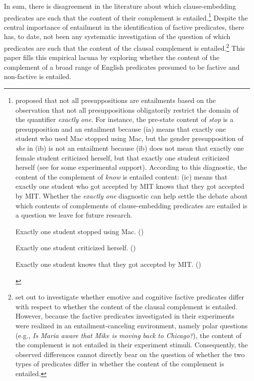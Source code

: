 \documentclass[11pt,fleqn]{article}
\newcommand{\6}{\mbox{$[\hspace*{-.6mm}[$}}
\newcommand{\9}{\mbox{$]\hspace*{-.6mm}]$}}
\begin{document}
In sum, there is disagreement in the literature about which clause-embedding predicates are such that the content of their complement is entailed.\footnote{\citealt{sudo-thesis} proposed that not all presuppositions are entailments based on the observation that not all presuppositions obligatorily restrict the domain of the quantifier {\em exactly one}. For instance, the pre-state content of {\em stop} is a presupposition and an entailment because (ia) means that exactly one student who used Mac stopped using Mac, but the gender presupposition of {\em she} in (ib) is not an entailment because (ib) does not mean that exactly one female student criticized herself, but that exactly one student criticized herself (see \citealt{zehr-schwarz2016,zehr-schwarz2018} for some experimental support). According to this diagnostic, the content of the complement of {\em know} is entailed content: (ic) means that exactly one student who got accepted by MIT knows that they got accepted by MIT. Whether the {\em exactly one} diagnostic can help settle the debate about which contents of complements of clause-embedding predicates are entailed is a question we leave for future research.

\begin{exe}
\begin{xlist}
\ex Exactly one student stopped using Mac. \hfill (\citealt[59]{sudo-thesis})

\ex Exactly one student criticized herself. \hfill (\citealt[61]{sudo-thesis})

\ex Exactly one student knows that they got accepted by MIT. \hfill (\citealt[64]{sudo-thesis})

\end{xlist}
\end{exe}} Despite the central importance of entailment in the identification of factive predicates, there has, to date, not been any systematic investigation of the question of which predicates are such that the content of the clausal complement is entailed.\footnote{\citet{djaerv-etal2016} set out to investigate whether emotive and cognitive factive predicates differ with respect to whether the content of the clausal complement is entailed. However, because the factive predicates investigated in their experiments were realized in an entailment-canceling environment, namely polar questions (e.g., {\em Is Maria aware that Mike is moving back to Chicago?}), the content of the complement is not entailed in their experiment stimuli. Consequently, the observed differences cannot directly bear on the question of whether the two types of predicates differ in whether the content of the complement is entailed.} This paper fills this empirical lacuna by exploring whether the content of the complement of a broad range of English predicates presumed to be factive and non-factive is entailed.
\end{document}
